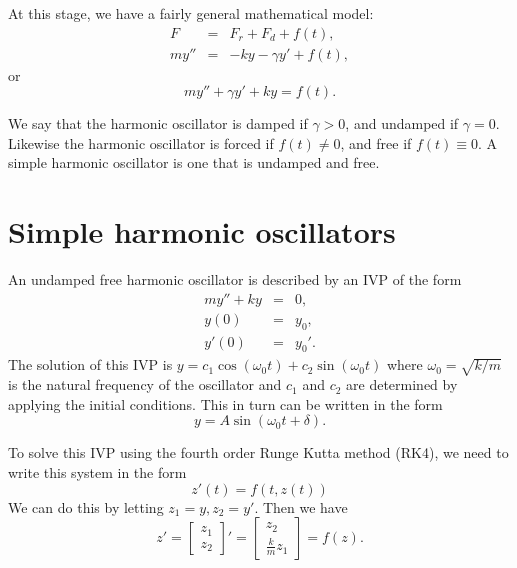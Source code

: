 At this stage, we have a fairly general mathematical model: 
\begin{eqnarray*}
F &=& F_r + F_d + f(t),\\
my'' &=& -ky -\gamma y' + f(t),
\end{eqnarray*}
or 
\[my''+\gamma y' + ky = f(t). \]

We say that the harmonic oscillator is damped if $\gamma > 0$, and undamped if $\gamma =0$. Likewise the harmonic oscillator is forced if $f(t) \not = 0$, and free if $f(t) \equiv 0$. A simple harmonic oscillator is one that is undamped and free. 

\section*{Simple harmonic oscillators}
An undamped free harmonic oscillator is described by an IVP of the form
\begin{eqnarray*}
my'' + ky &=& 0,\\
y(0) &=& y_0,\\
y'(0) &=& y_0'.
\end{eqnarray*} 
The solution of this IVP is $y = c_1\cos (\omega_0 t) + c_2 \sin (\omega_0 t)$ where $\omega_0 = \sqrt{k/m}$ is the natural frequency of the oscillator and $c_1$ and $c_2$ are determined by applying the initial conditions. This in turn can be written in the form 
\[y = A\sin (\omega_0 t + \delta) .\]

To solve this IVP using the fourth order Runge Kutta method (RK4), we need to write this system in the form 
\[z'(t) = f(t,z(t)) \]
We can do this by letting $z_1 = y, z_2 = y'$. Then we have 
\[     z'=  \left[\begin{array}{c}z_1 \\z_2\end{array}\right]'  =  \left[\begin{array}{c}z_2 \\\frac{k}{m}z_1\end{array}\right]= f(z).\]

